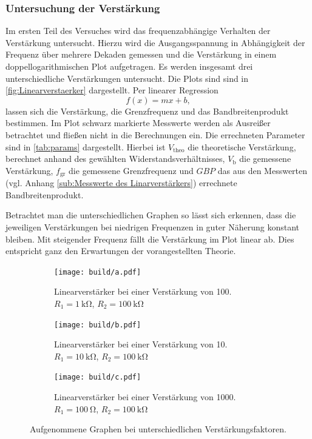 \subsubsection{Untersuchung der Verstärkung}
Im ersten Teil des Versuches wird das frequenzabhängige Verhalten der Verstärkung untersucht.
Hierzu wird die Ausgangsspannung in Abhängigkeit der Frequenz über mehrere Dekaden gemessen 
und die Verstärkung in einem doppellogarithmischen Plot aufgetragen.
Es werden insgesamt drei unterschiedliche Verstärkungen untersucht.
Die Plots sind sind in \autoref{fig:Linearverstaerker} dargestellt.
Per linearer Regression
\begin{equation*}
    f(x) = mx+b,
\end{equation*}
lassen sich die Verstärkung, die Grenzfrequenz und das Bandbreitenprodukt bestimmen.
Im Plot schwarz markierte Messwerte werden als Ausreißer betrachtet 
und fließen nicht in die Berechnungen ein.
Die errechneten Parameter sind in \autoref{tab:params} dargestellt.
Hierbei ist $V_\text{theo}$ die theoretische Verstärkung, berechnet anhand des gewählten 
Widerstandsverhältnisses, $V_\text{b}$ die gemessene Verstärkung, $f_\text{gr}$ die 
gemessene Grenzfrequenz und $GBP$ das aus den Messwerten 
(vgl. Anhang \ref{sub:Messwerte des Linarverstärkers}) errechnete Bandbreitenprodukt.

\FloatBarrier
Betrachtet man die unterschiedlichen Graphen so lässt sich erkennen, dass
die jeweiligen Verstärkungen bei niedrigen Frequenzen in guter Näherung konstant
bleiben. Mit steigender Frequenz fällt die Verstärkung im Plot linear ab.
Dies entspricht ganz den Erwartungen der vorangestellten Theorie.
\begin{figure}
    \centering
    \begin{subfigure}[b]{0.45\textwidth}
        \centering
        \texttt{[image: build/a.pdf]}
        \caption{Linearverstärker bei einer Verstärkung von 100. $R_1 = \SI{1}{\kilo\ohm}$,
        $R_2 = \SI{100}{\kilo\ohm}$ }
        \label{fig:a}
    \end{subfigure}
    \hfill
    \begin{subfigure}[b]{0.45\textwidth}
        \centering
        \texttt{[image: build/b.pdf]}
        \caption{Linearverstärker bei einer Verstärkung von 10. $R_1 = \SI{10}{\kilo\ohm}$,
        $R_2 = \SI{100}{\kilo\ohm}$ }
        \label{fig:b}
    \end{subfigure}
    \newline
    \newline    
    \newline    
    \newline    
    \begin{subfigure}[b]{0.45\textwidth}
        \centering
        \texttt{[image: build/c.pdf]}
        \caption{Linearverstärker bei einer Verstärkung von 1000. $R_1 = \SI{100}{\ohm}$,
        $R_2 = \SI{100}{\kilo\ohm}$ }
        \label{fig:c}
    \end{subfigure}
       \caption{Aufgenommene Graphen bei unterschiedlichen Verstärkungsfaktoren.}
       \label{fig:Linearverstaerker}
\end{figure}
\FloatBarrier

